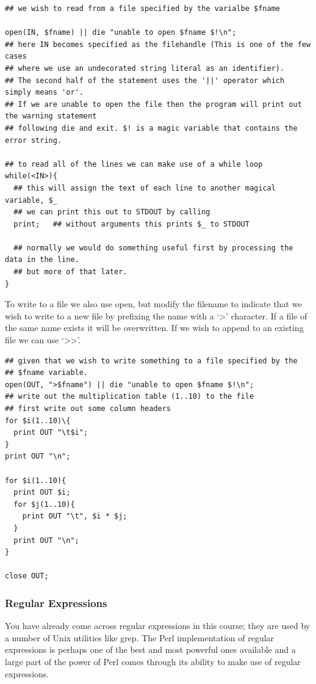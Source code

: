 \documentclass[11pt]{article}
\begin{document}
\begin{verbatim}
## we wish to read from a file specified by the varialbe $fname

open(IN, $fname) || die "unable to open $fname $!\n";
## here IN becomes specified as the filehandle (This is one of the few cases
## where we use an undecorated string literal as an identifier).
## The second half of the statement uses the '||' operator which simply means 'or'.
## If we are unable to open the file then the program will print out the warning statement
## following die and exit. $! is a magic variable that contains the error string.

## to read all of the lines we can make use of a while loop
while(<IN>){
  ## this will assign the text of each line to another magical variable, $_
  ## we can print this out to STDOUT by calling
  print;   ## without arguments this prints $_ to STDOUT

  ## normally we would do something useful first by processing the data in the line.
  ## but more of that later.
}
\end{verbatim}



To write to a file we also use open, but modify the filename to indicate
that we wish to write to a new file by prefixing the name with a `>'
character. If a file of the same name exists it will be overwritten. If
we wish to append to an existing file we can use `>>'.


\begin{verbatim}
## given that we wish to write something to a file specified by the
## $fname variable.
open(OUT, ">$fname") || die "unable to open $fname $!\n";
## write out the multiplication table (1..10) to the file
## first write out some column headers
for $i(1..10)\{
  print OUT "\t$i";
}
print OUT "\n";

for $i(1..10){
  print OUT $i;
  for $j(1..10){
    print OUT "\t", $i * $j;
  }
  print OUT "\n";
}

close OUT;
\end{verbatim}
\subsubsection{Regular Expressions}
\label{sec-5-6}


You have already come across regular expressions in this course; they
are used by a number of Unix utilities like grep. The Perl
implementation of regular expressions is perhaps one of the best and
most powerful ones available and a large part of the power of Perl comes
through its ability to make use of regular expressions.
\end{document}
